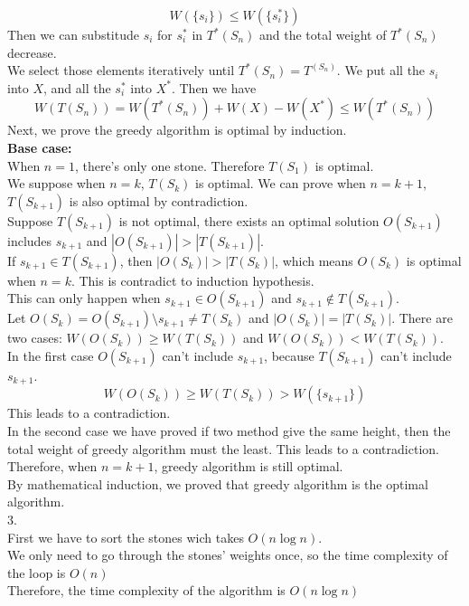 \documentclass[10.5pt]{article}
\begin{document}
$$
	W(\{s_i\}) \le W(\{s^*_i\})
$$
Then we can substitude $s_i$ for $s^*_i$ in $T^*(S_n)$ and the total weight of $T^*(S_n)$ decrease.\\
We select those elements iteratively until $T^*(S_n) = T^(S_n)$. We put all the $s_i$ into $X$, and all the $s^*_i$ into $X^*$. Then we have
$$
	W(T(S_n)) =W(T^*(S_n)) + W(X) - W(X^*) \le W(T^*(S_n))
$$
Next, we prove the greedy algorithm is optimal by induction.\\
\textbf{Base case:}\\
When $n = 1$, there's only one stone. Therefore $T(S_1)$ is optimal.\\
We suppose when $n = k$, $T(S_k)$ is optimal. We can prove when $n = k + 1$, $T(S_{k + 1})$ is also optimal by contradiction.\\
Suppose $T(S_{k+1})$ is not optimal, there exists an optimal solution $O(S_{k+1})$ includes $s_{k + 1}$ and $\left|O(S_{k + 1})\right| > \left|T(S_{k + 1})\right|$.
\\
If $s_{k + 1}\in T(S_{k + 1})$, then $\left|O(S_{k})\right| > \left|T(S_{k})\right|$, which means $O(S_k)$ is optimal when $n = k$. This is contradict to induction hypothesis.
\\
This can only happen when $s_{k + 1}\in O(S_{k+1})$ and $s_{k + 1}\notin T(S_{k + 1})$.\\
Let $O(S_{k}) = O(S_{k + 1})\setminus s_{k+1} \ne T(S_k)$ and $|O(S_{k})| = |T(S_k)|$.
There are two cases: $W(O(S_k))\ge W(T(S_k))$ and $W(O(S_k)) < W(T(S_k))$.\\
In the first case $O(S_{k + 1})$ can't include $s_{k + 1}$, because $T(S_{k + 1})$ can't include $s_{k + 1}$.
$$
	W(O(S_k))\ge W(T(S_k)) > W(\{s_{k + 1}\})
$$
This leads to a contradiction.\\
In the second case we have proved if two method give the same height, then the total weight of greedy algorithm must the least. This leads to a contradiction.\\
Therefore, when $n = k + 1$, greedy algorithm is still optimal.\\
By mathematical induction, we proved that greedy algorithm is the optimal algorithm.
\\
3.\\
First we have to sort the stones wich takes $O(n\log n)$.\\
We only need to go through the stones' weights once, so the time complexity of the loop is $O(n)$\\
Therefore, the time complexity of the algorithm is $O(n\log n)$
\end{document}
